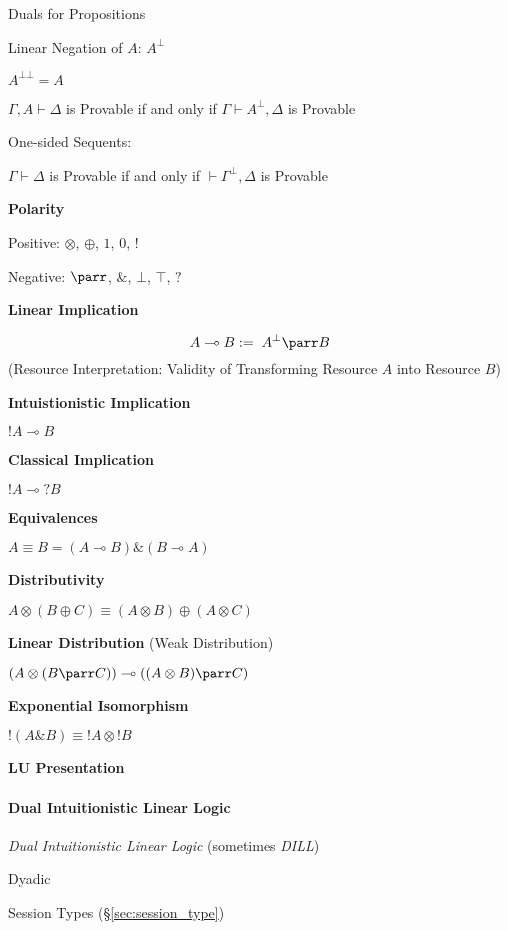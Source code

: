 Duals for Propositions %

Linear Negation of $A$: $A^\bot$

$A^{\bot\bot} = A$

\cite{llwiki16}
$\Gamma, A \vdash \Delta$ is Provable if and only if $\Gamma \vdash
A^\bot, \Delta$ is Provable

One-sided Sequents:

$\Gamma \vdash \Delta$ is Provable if and only if $\vdash \Gamma^\bot,
\Delta$ is Provable


\textbf{Polarity}

Positive: $\otimes$, $\oplus$, $1$, $0$, $!$

Negative: $\parr$, $\&$, $\bot$, $\top$, $?$


\textbf{Linear Implication}

\[
  A \multimap B := \; A^{\bot} \parr B
\]
(Resource Interpretation: Validity of Transforming Resource $A$ into
Resource $B$)


\textbf{Intuistionistic Implication}

$!A \multimap B$


\textbf{Classical Implication}

$!A \multimap ?B$


\textbf{Equivalences}

$A \equiv B = (A \multimap B) \& (B \multimap A)$


\textbf{Distributivity}

$A \otimes (B \oplus C) \equiv (A \otimes B) \oplus (A \otimes C)$


\textbf{Linear Distribution} (Weak Distribution)

$(A \otimes (B \parr C)) \multimap ((A \otimes B) \parr C)$


\textbf{Exponential Isomorphism}

$!(A \& B) \equiv !A \otimes !B$


\textbf{LU Presentation}



\paragraph{Dual Intuitionistic Linear Logic}\hfill
\label{sec:dual_linear_logic}

\cite{andreoli92}

\emph{Dual Intuitionistic Linear Logic} (sometimes \emph{DILL})

Dyadic

Session Types (\S\ref{sec:session_type})


